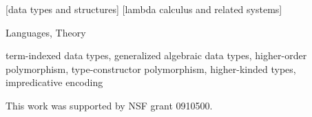\documentclass[preprint]{sigplanconf}
\theoremstyle{plain}
\theoremstyle{remark}
\theoremstyle{definition}
\begin{document}
[data types and structures]
[lambda calculus and related systems]

\terms
Languages, Theory

\keywords
term-indexed data types, generalized algebraic data types,
higher-order polymorphism, type-constructor polymorphism, higher-kinded types,
impredicative encoding











\appendix

\acks
This work was supported by NSF grant 0910500.








\end{document}
